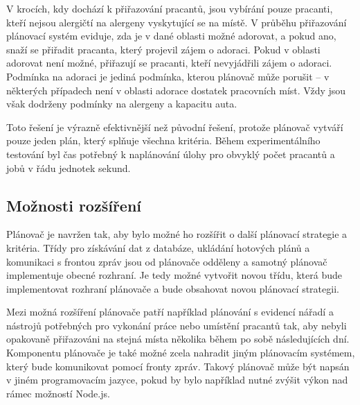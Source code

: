 V krocích, kdy dochází k přiřazování pracantů, jsou vybírání pouze pracanti, kteří nejsou alergičtí na alergeny vyskytující se na místě.
V průběhu přiřazování plánovací systém eviduje, zda je v dané oblasti možné adorovat, a pokud ano, snaží se přiřadit pracanta, který projevil zájem o adoraci.
Pokud v oblasti adorovat není možné, přiřazují se pracanti, kteří nevyjádřili zájem o adoraci.
Podmínka na adoraci je jediná podmínka, kterou plánovač může porušit -- v některých případech není v oblasti adorace dostatek pracovních míst.
Vždy jsou však dodrženy podmínky na alergeny a kapacitu auta.

Toto řešení je výrazně efektivnější než původní řešení, protože plánovač vytváří pouze jeden plán, který splňuje všechna kritéria.
Během experimentálního testování byl čas potřebný k naplánování úlohy pro obvyklý počet pracantů a jobů v řádu jednotek sekund.

\subsection{Možnosti rozšíření}

Plánovač je navržen tak, aby bylo možné ho rozšířit o další plánovací strategie a kritéria. Třídy pro získávání dat z databáze, ukládání hotových plánů
a komunikaci s frontou zpráv jsou od plánovače odděleny a samotný plánovač implementuje obecné rozhraní. Je tedy možné vytvořit novou třídu, která bude
implementovat rozhraní plánovače a bude obsahovat novou plánovací strategii.

Mezi možná rozšíření plánovače patří například plánování s evidencí nářadí a nástrojů potřebných pro vykonání práce nebo umístění pracantů tak,
aby nebyli opakovaně přiřazováni na stejná místa několika během po sobě následujících dní. Komponentu plánovače je také možné zcela nahradit
jiným plánovacím systémem, který bude komunikovat pomocí fronty zpráv. Takový plánovač může být napsán v jiném programovacím jazyce, pokud by bylo 
například nutné zvýšit výkon nad rámec možností Node.js.
